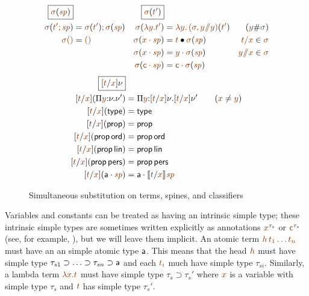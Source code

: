 \begin{figure}
\begin{align*}
\fbox{$\lf{\sigma}(\lf{\spi})$}&
&
\fbox{$\lf{\sigma}(\lf{t'})$}
\\
\lf{\sigma}(\lf{t'; \spi}) 
 & = \lf{\no{\lf{\sigma}(\lf{t'})}; \no{\lf{\sigma}(\lf{\spi})}} &
\lf{\sigma}(\lf{\lambda y.t'}) 
 & = \lf{\lambda y.\,\no{\lf{(\sigma, y/\!\!/y)}(\lf{t'})}}
 & (\lf{y} \# \lf{\sigma})
\\
\lf{\sigma}\lfnil 
 & = \lfnil &
\lf{\sigma}(\lf{\lfroot{x}{\spi}}) 
 & = \subst{\lf t}{\no{\lf{\sigma}(\lf{\spi})}}
      & \lf{t/x} \in \lf{\sigma} 
\\
& &
\lf{\sigma}(\lf{\lfroot{x}{\spi}}) 
 & = \lf{\lfroot{y}{\no{\lf{\sigma}(\lf{\spi})}}} 
      & \lf{y/\!\!/x} \in \lf{\sigma} 
\\
& &
\lf{\sigma}(\lf{\lfroot{\sf c}{\spi}}) 
 & = \lf{\lfroot{\sf c}{\no{\lf{\sigma}(\lf{\spi})}}} 
\end{align*}\begin{align*}
\fbox{$[{\lf{t}}/{\lf{x}}]{\nu}$} &
\\
[\lf{t}/\lf{x}](\lfpi{y}{\nu}{\nu'})
 & = \lfpi{y}{[\lf{t}/\lf{x}]\nu}{[\lf{t}/\lf{x}]\nu'}
     \qquad (\lf x \neq \lf y) 
\\
[\lf{t}/\lf{x}]({\sf type})
  & = {\sf type}
\\ 
[\lf{t}/\lf{x}]({\sf prop}) 
 & = {\sf prop} 
\\
[\lf{t}/\lf{x}]({\sf prop}\,{\sf ord}) 
 & = {\sf prop}\,{\sf ord} 
\\
[\lf{t}/\lf{x}]({\sf prop}\,{\sf lin}) 
 & = {\sf prop}\,{\sf lin} 
\\
[\lf{t}/\lf{x}]({\sf prop}\,{\sf pers}) 
 & = {\sf prop}\,{\sf pers} 
\\
[\lf{t}/\lf{x}](\lfroot{\sf a}{\spi}) 
 & = \lfroot{\sf a}{\no{\rsubst{\lf{t}}{\lf{x}}{\lf{\spi}}}} 
\end{align*}
\caption{Simultaneous substitution on terms, spines, and classifiers}
\label{fig:simsubst}
\end{figure}

Variables and constants can be treated as having an intrinsic simple
type; these intrinsic simple types are sometimes written explicitly as
annotations $\lf{x}^{\tau_s}$ or $\lf{\sf c}^{\tau_s}$ (see, for
example, \cite{pfenning08church}), but we will leave them implicit.
An atomic term $\lf{h\,t_1\ldots t_n}$ must have an an simple atomic
type ${\sf a}$. This means that the head $\lf h$ must have simple type
$\tau_{s1} \supset \ldots \supset \tau_{sn} \supset {\sf a}$ and each
$\lf{t_i}$ much have simple type $\tau_{si}$. Similarly, a lambda term
$\lf{\lambda x. t}$ must have simple type $\tau_s \supset \tau_s'$
where $\lf x$ is a variable with simple type $\tau_s$ and $\lf t$ has
simple type $\tau_s'$.  

